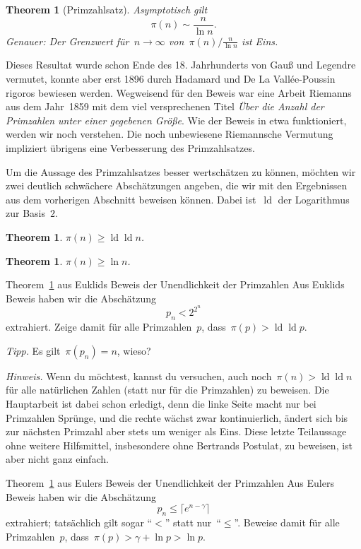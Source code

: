 \documentclass[twoside]{../zirkelblatt1415}
\theoremstyle{definition}
\theoremstyle{plain}
\newtheorem{thm}[defn]{Theorem}
\theoremstyle{remark}
\DeclareMathOperator{\ld}{ld}
\begin{document}
\begin{thm}[Primzahlsatz]\label{thm:primzahlsatz}
Asymptotisch gilt
\[ \pi(n) \sim \frac{n}{\ln n}. \]
Genauer: Der Grenzwert für~$n \to \infty$ von~$\pi(n) / \frac{n}{\ln n}$ ist
Eins.
\end{thm}

Dieses Resultat wurde schon Ende des 18. Jahrhunderts von Gauß und Legendre
vermutet, konnte aber erst 1896 durch Hadamard und De La Vallée-Poussin rigoros
bewiesen werden. Wegweisend für den Beweis war eine Arbeit Riemanns aus dem
Jahr~1859 mit dem viel versprechenen Titel \emph{Über die Anzahl der Primzahlen
unter einer gegebenen Größe}. Wie der Beweis in etwa funktioniert, werden wir
noch verstehen. Die noch unbewiesene Riemannsche Vermutung impliziert übrigens
eine Verbesserung des Primzahlsatzes.

Um die Aussage des Primzahlsatzes besser wertschätzen zu können, möchten wir
zwei deutlich schwächere Abschätzungen angeben, die wir mit den Ergebnissen aus
dem vorherigen Abschnitt beweisen können. Dabei ist~$\ld$ der Logarithmus zur
Basis~$2$.

\begin{thm}\label{thm:pi-schranke1}$\pi(n) \geq \ld \ld n$.\end{thm}
\begin{thm}\label{thm:pi-schranke2}$\pi(n) \geq \ln n$.\end{thm}

\begin{aufgabe}{Theorem~\ref{thm:pi-schranke1} aus Euklids Beweis der
Unendlichkeit der Primzahlen}
Aus Euklids Beweis haben wir die Abschätzung
\[ p_n < 2^{2^n} \]
extrahiert. Zeige damit für alle Primzahlen~$p$, dass~$\pi(p) > \ld \ld p$.

\emph{Tipp.} Es gilt~$\pi(p_n) = n$, wieso?

\emph{Hinweis.} Wenn du möchtest, kannst du versuchen, auch noch~$\pi(n) > \ld
\ld n$ für alle natürlichen Zahlen (statt nur für die Primzahlen) zu beweisen.
Die Hauptarbeit ist dabei schon erledigt, denn die linke Seite macht nur bei
Primzahlen Sprünge, und die rechte wächst zwar kontinuierlich, ändert sich bis
zur nächsten Primzahl aber stets um weniger als Eins. Diese letzte Teilaussage
ohne weitere Hilfsmittel, insbesondere ohne Bertrands Postulat, zu beweisen,
ist aber nicht ganz einfach.
\end{aufgabe}

\begin{aufgabe}{Theorem~\ref{thm:pi-schranke2} aus Eulers Beweis der
Unendlichkeit der Primzahlen}
Aus Eulers Beweis haben wir die Abschätzung
\[ p_n \leq \lceil e^{n-\gamma} \rceil \]
extrahiert; tatsächlich gilt sogar "`$<$"' statt nur~"`$\leq$"'. Beweise damit
für alle Primzahlen~$p$, dass~$\pi(p) > \gamma + \ln p > \ln p$.
\end{aufgabe}
\end{document}
